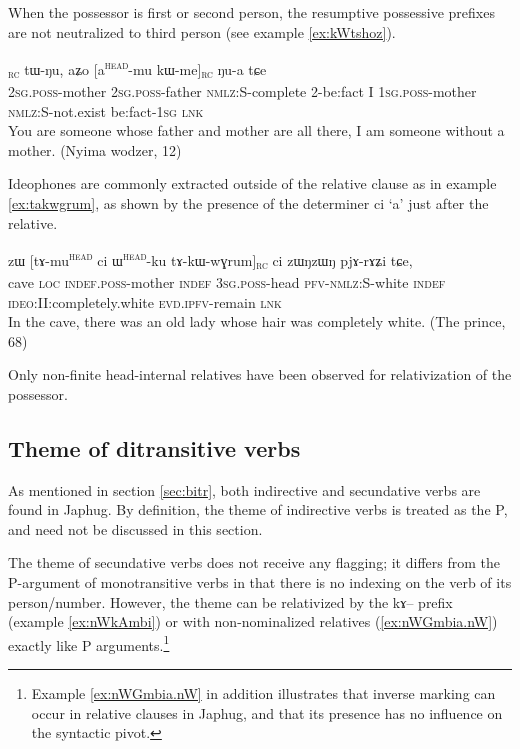 \documentclass[oldfontcommands,oneside,a4paper,11pt]{article}
\newcommand{\ipa}[1]{{\phon #1}} %
\newcommand{\tete}{\textsuperscript{\textsc{head}}}
\newcommand{\rc}{\textsubscript{\textsc{rc}}}
\begin{document}
When the possessor is   first or second person,  the resumptive possessive prefixes  are not neutralized to third person (see example \ref{ex:kWtshoz}).
        \begin{exe}
   \ex \label{ex:kWtshoz}
 \gll 
[\ipa{nɤ}\tete{}-\ipa{mu}   	\ipa{nɤ}\tete{}-\ipa{wa}   	\ipa{kɯ-tsʰoz}]\rc{}   	\ipa{tɯ-ŋu,}   	\ipa{aʑo}   	[\ipa{a}\tete{}-\ipa{mu}   	\ipa{kɯ-me}]\rc{}   	\ipa{ŋu-a}   	\ipa{tɕe}    \\
\textsc{2sg.poss}-mother \textsc{2sg.poss}-father \textsc{nmlz:S}-complete 2-be:{fact} I \textsc{1sg.poss}-mother \textsc{nmlz:S}-not.exist be:{fact}-\textsc{1sg} \textsc{lnk} \\
\glt You are someone whose father and mother are all there, I am someone without a mother. (Nyima wodzer, 12)
\end{exe}

Ideophones are commonly extracted outside of the relative clause as in example \ref{ex:takwgrum}, as shown by the presence of the determiner \ipa{ci} `a' just after the relative.

     \begin{exe}
   \ex \label{ex:takwgrum}
 \gll \ipa{praʁkʰaŋ}   	\ipa{zɯ}   	[\ipa{tɤ-mu}\tete{}   	\ipa{ci}   	\ipa{ɯ}\tete{}-\ipa{ku}   	\ipa{tɤ-kɯ-wɣrum}]\rc{}   	 	\ipa{ci} \ipa{zɯŋzɯŋ}    	\ipa{pjɤ-rɤʑi}   	\ipa{tɕe,}        \\
cave \textsc{loc} \textsc{indef.poss}-mother \textsc{indef} \textsc{3sg.poss}-head \textsc{pfv-nmlz:}S-white \textsc{indef} \textsc{ideo}:II:completely.white \textsc{evd.ipfv}-remain \textsc{lnk}  \\
\glt In the cave, there was an old lady whose hair was completely white. (The prince, 68)
\end{exe}

 
Only non-finite head-internal relatives have been observed for relativization of the possessor.
% 

\subsection{Theme of ditransitive verbs}  \label{sec:second}
As mentioned in section \ref{sec:bitr}, both indirective and secundative verbs are found in Japhug. By definition, the theme of indirective verbs is treated as the P, and need not be discussed in this section.

The theme of secundative verbs does not receive  any flagging; it differs from the P-argument of monotransitive verbs in that there is no indexing on the verb of its person/number. However, the theme can be relativized by the \ipa{kɤ}-- prefix (example \ref{ex:nWkAmbi}) or with non-nominalized relatives (\ref{ex:nWGmbia.nW}) exactly like P arguments.\footnote{Example \ref{ex:nWGmbia.nW} in addition illustrates that inverse marking can occur in relative clauses in Japhug, and that its presence has no influence on the syntactic pivot.}
\end{document}
